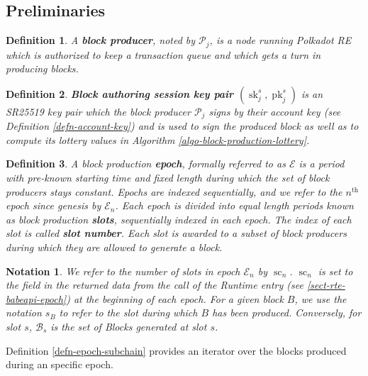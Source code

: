 \documentclass{book}
\newcommand{\tmop}[1]{\ensuremath{\operatorname{#1}}}
\newcommand{\tmstrong}[1]{\textbf{#1}}
\newcommand{\tmverbatim}[1]{{\ttfamily{#1}}}
\newtheorem{definition}{Definition}
\newtheorem{notation}{Notation}
\newtheorem{definition}{Definition}
\newtheorem{notation}{Notation}
\begin{document}
\subsection{Preliminaries}

\begin{definition}
  A {\tmstrong{block producer}}, noted by $\mathcal{P}_j$, is a node running
  Polkadot RE which is authorized to keep a transaction queue and which gets a
  turn in producing blocks.
\end{definition}

\begin{definition}
  {\tmstrong{Block authoring session key pair $(\tmop{sk}^s_j,
  \tmop{pk}^s_j)$}} is an SR25519 key pair which the block producer
  $\mathcal{P}_j$ signs by their account key (see Definition
  \ref{defn-account-key}) and is used to sign the produced block as well as to
  compute its lottery values in Algorithm \ref{algo-block-production-lottery}.
  
\end{definition}

\begin{definition}
  \label{defn-epoch-slot}A block production {\tmstrong{epoch}}, formally
  referred to as $\mathcal{E}$ is a period with pre-known starting time and
  fixed length during which the set of block producers stays constant. Epochs
  are indexed sequentially, and we refer to the $n^{\tmop{th}}$ epoch since
  genesis by $\mathcal{E}_n$. Each epoch is divided into equal length periods
  known as block production {\tmstrong{slots}}, sequentially indexed in each
  epoch. The index of each slot is called {\tmstrong{slot number}}. Each slot
  is awarded to a subset of block producers during which they are allowed to
  generate a block.
\end{definition}

\begin{notation}
  \label{note-slot}We refer to the number of slots in epoch $\mathcal{E}_n$ by
  $\tmop{sc}_n$. $\tmop{sc}_n$ is set to the \tmverbatim{duration} field in
  the returned data from the call of the Runtime entry
  \tmverbatim{BabeApi\_epoch} (see \ref{sect-rte-babeapi-epoch}) at the
  beginning of each epoch. For a given block $B$, we use the notation
  {\tmstrong{$s_B$}} to refer to the slot during which $B$ has been produced.
  Conversely, for slot $s$, $\mathcal{B}_s$ is the set of Blocks generated at
  slot $s$.
\end{notation}

Definition \ref{defn-epoch-subchain} provides an iterator over the blocks
produced during an specific epoch.
\end{document}
